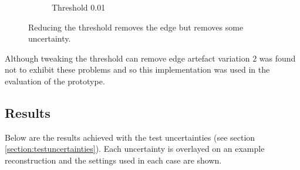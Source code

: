 \begin{figure}[H]
\begin{subfigure}[b]{0.5\textwidth}
    \caption{Threshold 0.01}
    \label{fig:thresholdingvariation1threshold3}  
  \end{subfigure}  
  \caption{Reducing the threshold removes the edge but removes some uncertainty.}\label{fig:thresholdingvariationfix}
\end{figure}

Although tweaking the threshold can remove edge artefact variation 2 was found not to exhibit these problems and so this implementation was used in the evaluation of the prototype.

\newpage
\subsection*{Results}
Below are the results achieved with the test uncertainties (see section \ref{section:testuncertainties}). Each uncertainty is overlayed on an example reconstruction and the settings used in each case are shown.

